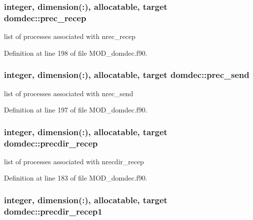 \hypertarget{classdomdec_a567096a53173ef0bbf5ab415f6ba4e70}{
\subsubsection[{prec\-\_\-recep}]{\setlength{\rightskip}{0pt plus 5cm}integer, dimension(\-:), allocatable, target domdec\-::prec\-\_\-recep}}\label{classdomdec_a567096a53173ef0bbf5ab415f6ba4e70}


list of processes associated with nrec\-\_\-recep 



Definition at line 198 of file M\-O\-D\-\_\-domdec.\-f90.

\hypertarget{classdomdec_ad353099c77cb5a206fbcd6fbca9cea8f}{
\subsubsection[{prec\-\_\-send}]{\setlength{\rightskip}{0pt plus 5cm}integer, dimension(\-:), allocatable, target domdec\-::prec\-\_\-send}}\label{classdomdec_ad353099c77cb5a206fbcd6fbca9cea8f}


list of processes associated with nrec\-\_\-send 



Definition at line 197 of file M\-O\-D\-\_\-domdec.\-f90.

\hypertarget{classdomdec_a9d4ef203aab7fcb23853f1094862b4da}{
\subsubsection[{precdir\-\_\-recep}]{\setlength{\rightskip}{0pt plus 5cm}integer, dimension(\-:), allocatable, target domdec\-::precdir\-\_\-recep}}\label{classdomdec_a9d4ef203aab7fcb23853f1094862b4da}


list of processes associated with nrecdir\-\_\-recep 



Definition at line 183 of file M\-O\-D\-\_\-domdec.\-f90.

\hypertarget{classdomdec_abd7674f40dc278e85d7a97360a487819}{
\subsubsection[{precdir\-\_\-recep1}]{\setlength{\rightskip}{0pt plus 5cm}integer, dimension(\-:), allocatable, target domdec\-::precdir\-\_\-recep1}}\label{classdomdec_abd7674f40dc278e85d7a97360a487819}


